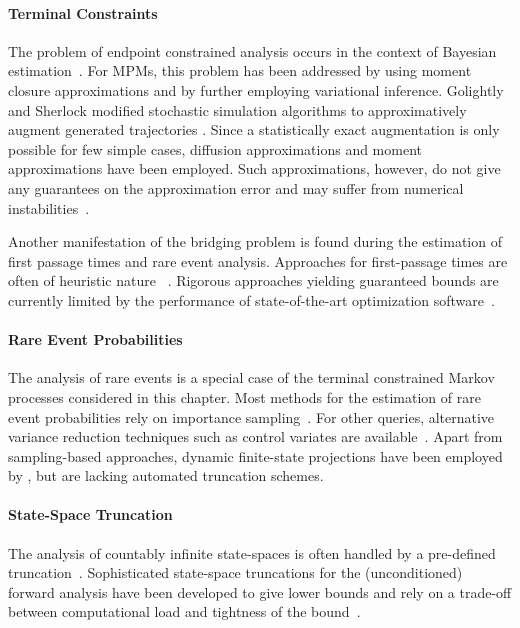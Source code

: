 \paragraph{Terminal Constraints}
The problem of endpoint constrain\-ed analysis occurs in the context of Bayesian estimation~\parencite{sarkka2013bayesian}. 
For \acp{MPM}, this problem has been addressed by \citet{huang2016reconstructing} using moment closure approximations and by \citet{wildner2019moment} further employing variational inference.
Golightly and Sherlock modified stochastic simulation algorithms to approximatively  
augment generated trajectories  \parencite{golightly2019efficient}.
Since a statistically exact augmentation is only possible for few simple cases, diffusion approximations \parencite{golightly2005bayesian} and moment approximations \parencite{milner2013moment} have been employed.
Such approximations, however, do not give any guarantees on the approximation error
and may suffer from numerical instabilities~\parencite{schnoerr2014validity}.

Another manifestation of the bridging problem is found during the estimation of first passage times and rare event analysis.
Approaches for first-passage times are often of heuristic nature ~\parencite{schnoerr2017efficient,hayden2012fluid,bortolussi2014stochastic}. Rigorous approaches yielding guaranteed bounds are currently limited by the performance of state-of-the-art optimization software~\parencite{backenkohler2019bounding}.

\paragraph{Rare Event Probabilities}
The analysis of rare events is a special case of the terminal constrained Markov processes considered in this chapter.
Most methods for the estimation of rare event probabilities  rely on  importance sampling~\parencite{kuwahara2008efficient,daigle2011automated}.
For other queries, alternative variance reduction techniques such as control variates are available~\parencite{backenkohler2019control}.
Apart from sampling-based approaches, dynamic finite-state projections have been employed by \citet{mikeev2013numerical}, but are lacking automated truncation schemes.

\paragraph{State-Space Truncation}
The analysis of countably infinite state-spaces is often handled by a pre-defined truncation~\parencite{kwiatkowska2011prism}.
Sophisticated state-space truncations for the (unconditioned) forward analysis have been developed to give lower bounds and rely on a trade-off between computational load and tightness of the bound~\parencite{munsky2006finite,lapin2011shave,andreychenko2011parameter,henzinger2009sliding,mikeev2013fly}.

